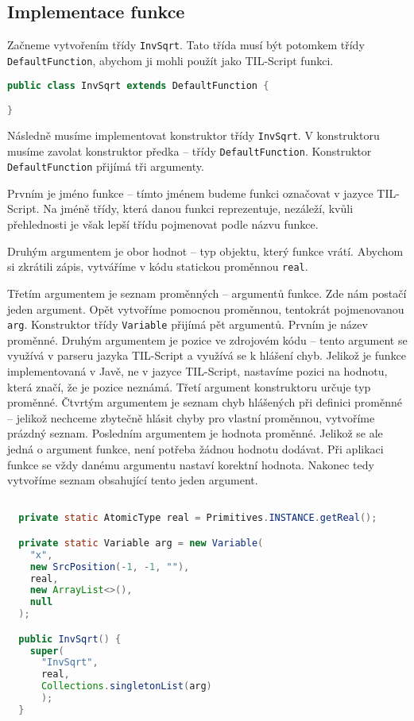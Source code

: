 \subsection{Implementace funkce}

Začneme vytvořením třídy \lstinline{InvSqrt}. Tato třída musí být potomkem třídy
\lstinline{DefaultFunction}, abychom ji mohli použít jako TIL-Script funkci.

\begin{lstlisting}[caption={Třída InvSqrt}, language=Java]
public class InvSqrt extends DefaultFunction {

}
\end{lstlisting}

Následně musíme implementovat konstruktor třídy \lstinline{InvSqrt}. V konstruktoru musíme zavolat
konstruktor předka -- třídy \lstinline{DefaultFunction}. Konstruktor \lstinline{DefaultFunction}
přijímá tři argumenty.

Prvním je jméno funkce -- tímto jménem budeme funkci označovat v jazyce TIL-Script. Na jméně třídy,
která danou funkci reprezentuje, nezáleží, kvůli přehlednosti je však lepší třídu pojmenovat podle
názvu funkce.

Druhým argumentem je obor hodnot -- typ objektu, který funkce vrátí. Abychom si zkrátili zápis,
vytváříme v kódu statickou proměnnou \lstinline{real}.

Třetím argumentem je seznam proměnných -- argumentů funkce. Zde nám postačí jeden argument. Opět
vytvoříme pomocnou proměnnou, tentokrát pojmenovanou \lstinline{arg}. Konstruktor třídy
\lstinline{Variable} přijímá pět argumentů. Prvním je název proměnné. Druhým argumentem je pozice
ve zdrojovém kódu -- tento argument se využívá v parseru jazyka TIL-Script a využívá se k hlášení
chyb. Jelikož je funkce implementovaná v Javě, ne v jazyce TIL-Script, nastavíme pozici na hodnotu,
která značí, že je pozice neznámá. Třetí argument konstruktoru určuje typ proměnné. Čtvrtým
argumentem je seznam chyb hlášených při definici proměnné -- jelikož nechceme zbytečně hlásit chyby
pro vlastní proměnnou, vytvoříme prázdný seznam. Posledním argumentem je hodnota proměnné. Jelikož
se ale jedná o argument funkce, není potřeba žádnou hodnotu dodávat. Při aplikaci funkce se vždy
danému argumentu nastaví korektní hodnota. Nakonec tedy vytvoříme seznam obsahující tento jeden
argument.

\begin{lstlisting}[caption={Konstruktor InvSqrt}, language=Java]

  private static AtomicType real = Primitives.INSTANCE.getReal();

  private static Variable arg = new Variable(
    "x",
    new SrcPosition(-1, -1, ""),
    real,
    new ArrayList<>(),
    null
  );

  public InvSqrt() {
    super(
      "InvSqrt",
      real,
      Collections.singletonList(arg)
      );
  }
\end{lstlisting}

